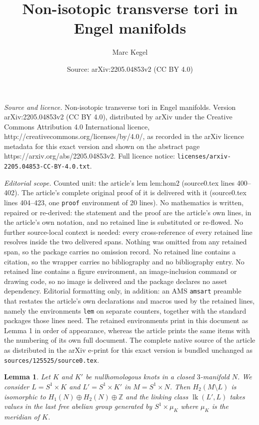 \documentclass[10pt,a4paper]{amsart}
\title{Non-isotopic transverse tori in Engel manifolds}
\author{Marc Kegel}
\date{Source: arXiv:2205.04853v2 (CC BY 4.0)}
\newtheorem{lem}{Lemma}
\newcommand{\Z}{\mathbb{Z}}
\DeclareMathOperator{\lk}{lk}
\begin{document}
\maketitle

\noindent\emph{Source and licence.} Non-isotopic transverse tori in Engel manifolds. Version arXiv:2205.04853v2 (CC BY 4.0), distributed by arXiv under the Creative Commons Attribution 4.0 International licence, http://creativecommons.org/licenses/by/4.0/, as recorded in the arXiv licence metadata for this exact version and shown on the abstract page https://arxiv.org/abs/2205.04853v2. Full licence notice: \texttt{licenses/arxiv-2205.04853-CC-BY-4.0.txt}.\par\smallskip

\noindent\textit{Editorial scope.} Counted unit: the article's lem lem:hom2 (source0.tex lines 400--402). The article's complete original proof of it is delivered with it (source0.tex lines 404--423, one \texttt{proof} environment of 20 lines). No mathematics is written, repaired or re-derived: the statement and the proof are the article's own lines, in the article's own notation, and no retained line is substituted or re-flowed.  No further source-local context is needed: every cross-reference of every retained line resolves inside the two delivered spans.  Nothing was omitted from any retained span, so the package carries no omission record.  No retained line contains a citation, so the wrapper carries no bibliography and no bibliography entry.  No retained line contains a figure environment, an image-inclusion command or drawing code, so no image is delivered and the package declares no asset dependency.  Editorial formatting only, in addition: an AMS \texttt{amsart} preamble that restates the article's own declarations and macros used by the retained lines, namely the environments \texttt{lem} on separate counters, together with the standard packages those lines need.  The retained environments print in this document as Lemma 1 in order of appearance, whereas the article prints the same items with the numbering of its own full document.  The complete native source of the article as distributed in the arXiv e-print for this exact version is bundled unchanged as \texttt{sources/125525/source0.tex}.
\begin{lem} \label{lem:hom2}
Let $K$ and $K'$ be nullhomologous knots in a closed $3$-manifold $N$. We consider $L=S^1\times K$ and $L'=S^1\times K'$ in $M=S^1\times N$. Then $H_2(M\setminus L)$ is isomorphic to $H_1(N)\oplus H_2(N)\oplus \Z$ and the linking class $\lk(L',L)$ takes values in the last free abelian group generated by $S^1\times \mu_K$ where $\mu_K$ is the meridian of $K$.
\end{lem}
\end{document}
